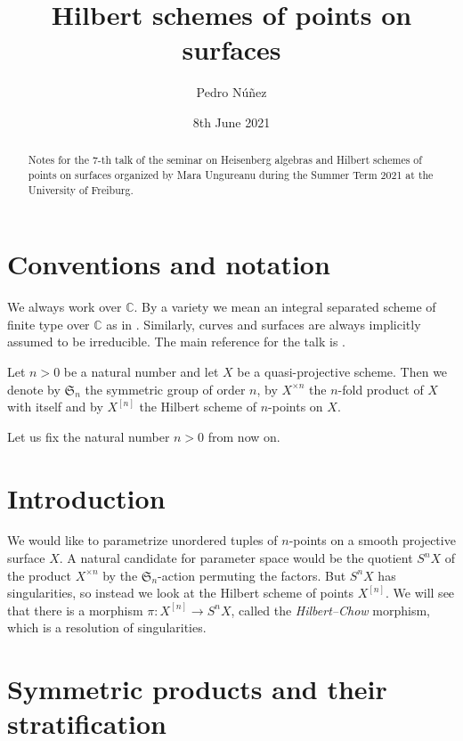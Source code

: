 \documentclass[12pt,a4paper]{amsart}
\title[Hilbert schemes of points on surfaces]{Hilbert schemes of points on surfaces}
\author[Pedro N\'{u}\~{n}ez]{Pedro N\'{u}\~{n}ez}
\date{8th June 2021}
\theoremstyle{plain}
\theoremstyle{definition}
\theoremstyle{remark}
\begin{document}
\maketitle

\begin{abstract}
  Notes for the $7$-th talk of the seminar on Heisenberg algebras and Hilbert schemes of points on surfaces organized by Mara Ungureanu during the Summer Term 2021 at the University of Freiburg.
\end{abstract}

\tableofcontents

\setcounter{section}{-1}

\section{Conventions and notation}

We always work over $\mathbb{C}$.
By a variety we mean an integral separated scheme of finite type over $\mathbb{C}$ as in \cite{har77}.
Similarly, curves and surfaces are always implicitly assumed to be irreducible.
The main reference for the talk is \cite[\S 1]{nak99}.

Let $n > 0$ be a natural number and let $X$ be a quasi-projective scheme.
Then we denote by $\mathfrak{S}_{n}$ the symmetric group of order $n$, by $X^{\times n}$ the $n$-fold product of $X$ with itself and by $X^{[n]}$ the Hilbert scheme of $n$-points on $X$.

Let us fix the natural number $n > 0$ from now on.

\section{Introduction}

We would like to parametrize unordered tuples of $n$-points on a smooth projective surface $X$.
A natural candidate for parameter space would be the quotient $S^{n}X$ of the product $X^{\times n}$ by the $\mathfrak{S}_{n}$-action permuting the factors.
But $S^{n}X$ has singularities, so instead we look at the Hilbert scheme of points $X^{[n]}$.
We will see that there is a morphism $\pi \colon X^{[n]} \to S^{n}X$, called the \textit{Hilbert--Chow} morphism, which is a resolution of singularities.

\section{Symmetric products and their stratification}
\end{document}
